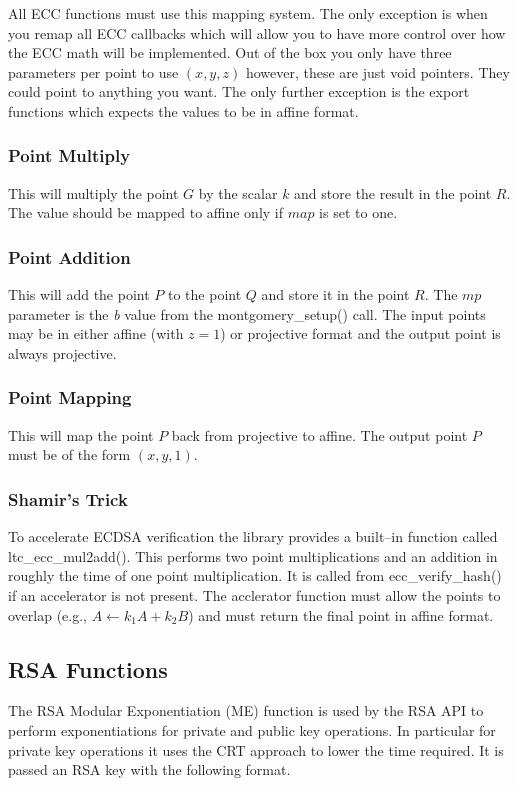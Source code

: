 \documentclass[synpaper]{book}
\begin{document}
All ECC functions must use this mapping system.  The only exception is when you remap all ECC callbacks which will allow you to have more control
over how the ECC math will be implemented.  Out of the box you only have three parameters per point to use $(x, y, z)$ however, these are just void pointers.
They could point to anything you want.  The only further exception is the export functions which expects the values to be in affine format.

\subsubsection{Point Multiply}
This will multiply the point $G$ by the scalar $k$ and store the result in the point $R$.  The value should be mapped to affine only if $map$ is set to one.

\subsubsection{Point Addition}
This will add the point $P$ to the point $Q$ and store it in the point $R$.  The $mp$ parameter is the \textit{b} value from the montgomery\_setup() call.  The input points
may be in either affine (with $z = 1$) or projective format and the output point is always projective.

\subsubsection{Point Mapping}
This will map the point $P$ back from projective to affine.  The output point $P$ must be of the form $(x, y, 1)$.

\subsubsection{Shamir's Trick}
To accelerate ECDSA verification the library provides a built--in function called ltc\_ecc\_mul2add().  This performs two point multiplications and an addition in
roughly the time of one point multiplication.  It is called from ecc\_verify\_hash() if an accelerator is not present.  The acclerator function must allow the points to
overlap (e.g., $A \leftarrow k_1A + k_2B$) and must return the final point in affine format.


\subsection{RSA Functions}
The RSA Modular Exponentiation (ME) function is used by the RSA API to perform exponentiations for private and public key operations.  In particular for
private key operations it uses the CRT approach to lower the time required.  It is passed an RSA key with the following format.
\end{document}
